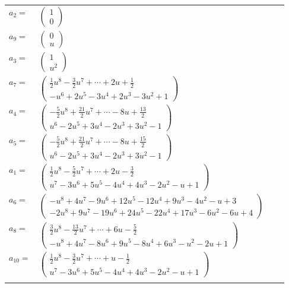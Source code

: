 \documentclass[1p]{elsarticle_modified}
\theoremstyle{definition}
\begin{document}
\begin{tabular}{m{7pt} m{180pt} m{7pt} m{180pt} }
\flushright $a_{2}=$&$\begin{pmatrix}1\\0\end{pmatrix}$ \\
\flushright $a_{9}=$&$\begin{pmatrix}0\\u\end{pmatrix}$ \\
\flushright $a_{3}=$&$\begin{pmatrix}1\\u^2\end{pmatrix}$ \\
\flushright $a_{7}=$&$\begin{pmatrix}\frac{1}{2} u^8-\frac{3}{2} u^7+\cdots+2 u+\frac{1}{2}\\- u^6+2 u^5-3 u^4+2 u^3-3 u^2+1\end{pmatrix}$ \\
\flushright $a_{4}=$&$\begin{pmatrix}-\frac{5}{2} u^8+\frac{21}{2} u^7+\cdots-8 u+\frac{13}{2}\\u^6-2 u^5+3 u^4-2 u^3+3 u^2-1\end{pmatrix}$ \\
\flushright $a_{5}=$&$\begin{pmatrix}-\frac{5}{2} u^8+\frac{21}{2} u^7+\cdots-8 u+\frac{15}{2}\\u^6-2 u^5+3 u^4-2 u^3+3 u^2-1\end{pmatrix}$ \\
\flushright $a_{1}=$&$\begin{pmatrix}\frac{1}{2} u^8-\frac{5}{2} u^7+\cdots+2 u-\frac{3}{2}\\u^7-3 u^6+5 u^5-4 u^4+4 u^3-2 u^2- u+1\end{pmatrix}$ \\
\flushright $a_{6}=$&$\begin{pmatrix}- u^8+4 u^7-9 u^6+12 u^5-12 u^4+9 u^3-4 u^2- u+3\\-2 u^8+9 u^7-19 u^6+24 u^5-22 u^4+17 u^3-6 u^2-6 u+4\end{pmatrix}$ \\
\flushright $a_{8}=$&$\begin{pmatrix}\frac{3}{2} u^8-\frac{13}{2} u^7+\cdots+6 u-\frac{5}{2}\\- u^8+4 u^7-8 u^6+9 u^5-8 u^4+6 u^3- u^2-2 u+1\end{pmatrix}$ \\
\flushright $a_{10}=$&$\begin{pmatrix}\frac{1}{2} u^8-\frac{3}{2} u^7+\cdots+u-\frac{1}{2}\\u^7-3 u^6+5 u^5-4 u^4+4 u^3-2 u^2- u+1\end{pmatrix}$\\&\end{tabular}
\end{document}
